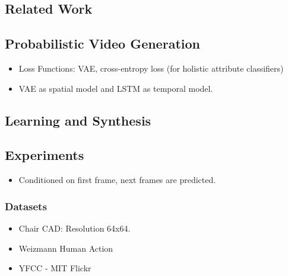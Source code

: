 \documentclass{article}
\begin{document}
    \subsection{Related Work}\label{subsec:Probabilistic_Video_Generation_using_Holistic_Attribute_Control_(VideoVAE):related-work}

    \subsection{Probabilistic Video Generation}\label{subsec:Probabilistic_Video_Generation_using_Holistic_Attribute_Control_(VideoVAE):probabilistic-video-generation}
    \begin{itemize}
        \item Loss Functions: VAE, cross-entropy loss (for holistic attribute classifiers)
        \item VAE as spatial model and LSTM as temporal model.
    \end{itemize}

    \subsection{Learning and Synthesis}\label{subsec:Probabilistic_Video_Generation_using_Holistic_Attribute_Control_(VideoVAE):learning-and-synthesis}

    \subsection{Experiments}\label{subsec:Probabilistic_Video_Generation_using_Holistic_Attribute_Control_(VideoVAE):experiments}
    \begin{itemize}
        \item Conditioned on first frame, next frames are predicted.
    \end{itemize}

    \subsubsection{Datasets}\label{subsubsec:Probabilistic_Video_Generation_using_Holistic_Attribute_Control_(VideoVAE):datasets}
    \begin{itemize}
        \item Chair CAD: Resolution 64x64.
        \item Weizmann Human Action
        \item YFCC - MIT Flickr
    \end{itemize}
\end{document}
